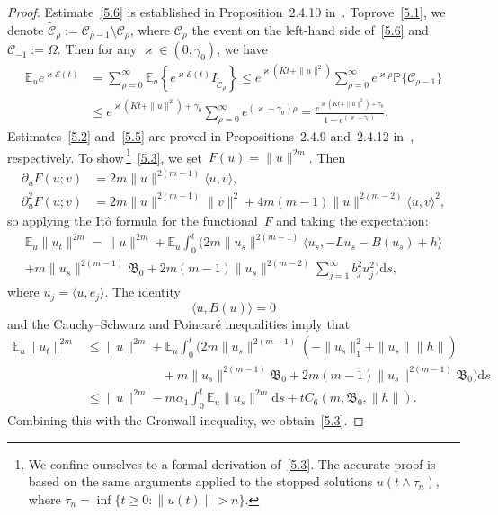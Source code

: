 \documentclass[AHL,Unicode,longabstracts]{cedram}
\newcommand{\p}{\partial}
\newcommand{\pP}{{\mathbb P}}
\newcommand{\E}{{\mathbb E}}
\newcommand{\CC}{{\mathcal C}}
\newcommand{\EE}{{\mathcal E}}
\newcommand{\vk}{{\varkappa}}
\newcommand{\ty}{\infty}
\newcommand{\BBBB}{{\mathfrak B}}
\newcommand{\lag}{\langle}
\newcommand{\rag}{\rangle}
\newcommand{\dd}{\mathrm{d}}
\begin{document}
\begin{proof}
Estimate~\eqref{5.6} is established in Proposition~2.4.10 in~\cite{KS-book}. To\linebreak prove~\eqref{5.1}, we denote $\tilde\CC_\rho:=\CC_{\rho-1}\setminus\CC_\rho $, where $\CC_\rho$ the event on the left-hand side of~\eqref{5.6} and $\CC_{-1}:=\Omega$. Then for any $\vk\in (0,\gamma_0)$, we have
\begin{align*}
\E_u e^{\varkappa \EE(t)} &= \sum_{\rho=0}^\ty\E_u \left\{e^{\varkappa \EE(t)} I_{\tilde \CC_\rho}\right\}\le e^{\varkappa(Kt+\|u\|^2)}
\sum_{\rho=0}^\ty e^{\varkappa \rho} \pP\{ \CC_{\rho-1}\} \\&\le e^{\varkappa(Kt+\|u\|^2)+\gamma_0}
\sum_{\rho=0}^\ty e^{(\varkappa-\gamma_0) \rho} = \frac{e^{\varkappa(Kt+\|u\|^2)+\gamma_0}}{ 1 -e^{(\varkappa-\gamma_0) }}.
\end{align*}
Estimates~\eqref{5.2} and~\eqref{5.5} are proved in Propositions~2.4.9 and~2.4.12 in~\cite{KS-book}, respectively. To show\,\footnote{We confine ourselves to a formal derivation of~\eqref{5.3}. The accurate proof is based on the same arguments applied to the stopped solutions $u(t\wedge \tau_n)$, where $\tau_n=\inf\{t\ge0: \|u(t)\|> n\}$.}~\eqref{5.3}, we set~$F(u)= \|u\|^{2m}$. Then
\begin{align*}
\p_u F(u;v)&=2m \|u\|^{2(m-1)} \lag u,v\rag,\\
\p^2_u F(u;v)&= 2m\|u\|^{2(m-1)} \|v\|^2+4m(m-1)\|u\|^{2(m-2)} \lag u,v\rag^2,
\end{align*}
so applying the It\^o formula for the functional~$F$ and taking the expectation:
\begin{multline*}
\E_u\|u_t\|^{2m}=\|u\|^{2m}+\E_u\int_0^t \Bigg(2m\|u_s\|^{2(m-1)}\lag u_s, -L u_s-B(u_s)+h\rag\\
+ m \|u_s\|^{2(m-1)} \BBBB_{0}+2m(m-1)\|u_s\|^{2(m-2)} \sum_{j=1}^\ty b_j^2u_j^2
\Bigg)\dd s,
\end{multline*}
where $u_j=\lag u, e_j\rag$. The identity
\begin{equation}\label{5.7}
\lag u, B(u)\rag=0
\end{equation}
and the Cauchy--Schwarz and Poincar\'e inequalities imply that
\begin{align*}
\E_u\|u_t\|^{2m}&\le\|u\|^{2m}+\E_u\int_0^t \big(2m\|u_s\|^{2(m-1)}(-\|u_s\|_1^2+\| u_s\|\|h\|) \\
&\qquad\qquad\qquad+ m \|u_s\|^{2(m-1)} \BBBB_{0}+2m(m-1)\|u_s\|^{2(m-1)} \BBBB_{0}\big)\dd s\\
&\le\|u\|^{2m}-m\alpha_1 \int_0^t \E_u\|u_s\|^{2m}\dd s +tC_6(m,\BBBB_{0},\|h\|).
\end{align*}
Combining this with the Gronwall inequality, we obtain~\eqref{5.3}.


\end{proof}
\end{document}
